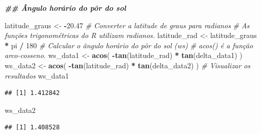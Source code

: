 \documentclass[
]{article}
\newenvironment{Shaded}{\begin{snugshade}}{\end{snugshade}}
\newcommand{\CommentTok}[1]{\textcolor[rgb]{0.56,0.35,0.01}{\textit{#1}}}
\newcommand{\DecValTok}[1]{\textcolor[rgb]{0.00,0.00,0.81}{#1}}
\newcommand{\DocumentationTok}[1]{\textcolor[rgb]{0.56,0.35,0.01}{\textbf{\textit{#1}}}}
\newcommand{\FloatTok}[1]{\textcolor[rgb]{0.00,0.00,0.81}{#1}}
\newcommand{\FunctionTok}[1]{\textcolor[rgb]{0.13,0.29,0.53}{\textbf{#1}}}
\newcommand{\NormalTok}[1]{#1}
\newcommand{\OtherTok}[1]{\textcolor[rgb]{0.56,0.35,0.01}{#1}}
\newcommand{\SpecialCharTok}[1]{\textcolor[rgb]{0.81,0.36,0.00}{\textbf{#1}}}
\begin{document}
\begin{Shaded}
\begin{Highlighting}[]
\DocumentationTok{\#\# Ângulo horário do pôr do sol}

\NormalTok{latitude\_graus }\OtherTok{\textless{}{-}} \SpecialCharTok{{-}}\FloatTok{20.47}
\CommentTok{\# Converter a latitude de graus para radianos}
\CommentTok{\# As funções trigonométricas do R utilizam radianos.}
\NormalTok{latitude\_rad }\OtherTok{\textless{}{-}}\NormalTok{ latitude\_graus }\SpecialCharTok{*}\NormalTok{ pi }\SpecialCharTok{/} \DecValTok{180}
\CommentTok{\# Calcular o ângulo horário do pôr do sol (ws)}
\CommentTok{\# acos() é a função arco{-}cosseno.}
\NormalTok{ws\_data1 }\OtherTok{\textless{}{-}} \FunctionTok{acos}\NormalTok{(}
  \SpecialCharTok{{-}}\FunctionTok{tan}\NormalTok{(latitude\_rad) }\SpecialCharTok{*} \FunctionTok{tan}\NormalTok{(delta\_data1)}
\NormalTok{)}
\NormalTok{ws\_data2 }\OtherTok{\textless{}{-}} \FunctionTok{acos}\NormalTok{(}
  \SpecialCharTok{{-}}\FunctionTok{tan}\NormalTok{(latitude\_rad) }\SpecialCharTok{*} \FunctionTok{tan}\NormalTok{(delta\_data2)}
\NormalTok{)}
\CommentTok{\# Visualizar os resultados}
\NormalTok{ws\_data1}
\end{Highlighting}
\end{Shaded}

\begin{verbatim}
## [1] 1.412842
\end{verbatim}

\begin{Shaded}
\begin{Highlighting}[]
\NormalTok{ws\_data2}
\end{Highlighting}
\end{Shaded}

\begin{verbatim}
## [1] 1.408528
\end{verbatim}
\end{document}
